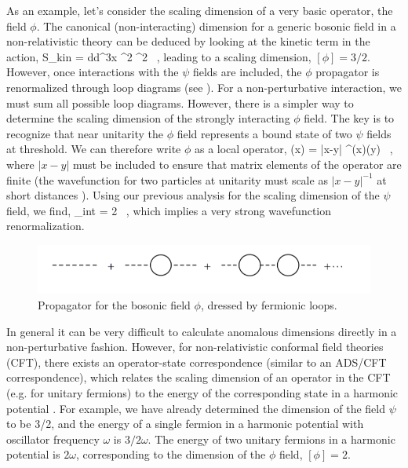 As an example, let's consider the scaling dimension of a very basic operator, the field $\phi$. The canonical (non-interacting) dimension for a generic bosonic field in a non-relativistic theory can be deduced by looking at the kinetic term in the action,
\beq
S_{\mbox{\tiny kin}} = \int d\tau d^3x \nabla^2 \phi^2 \ ,
\eeq
leading to a scaling dimension, $[\phi] = 3/2$. However, once interactions with the $\psi$ fields are included, the $\phi$ propagator is renormalized through loop diagrams (see ). For a non-perturbative interaction, we must sum all possible loop diagrams. However, there is a simpler way to determine the scaling dimension of the strongly interacting $\phi$ field. The key is to recognize that near unitarity the $\phi$ field represents a bound state of two $\psi$ fields at threshold. We can therefore write $\phi$ as a local operator,
\beq
\phi(x) =  |x-y| \psi^{\dagger}(x)\psi(y) \ ,
\eeq
where $|x-y|$ must be included to ensure that matrix elements of the operator are finite (the wavefunction for two particles at unitarity must scale as $|x-y|^{-1}$ at short distances \cite{NishidaSonConformal}). Using our previous analysis for the scaling dimension of the $\psi$ field, we find,
\beq
[\phi]_{\mbox{\tiny int}} = 2 \ ,
\eeq
which implies a very strong wavefunction renormalization.

\begin{figure}
\begin{center}
\includegraphics[width=\linewidth]{Chapter5-figures/dimer2}
\end{center}
\caption{\label{fig:phiprop}Propagator for the bosonic field $\phi$, dressed by fermionic loops.}
\end{figure}

In general it can be very difficult to calculate anomalous dimensions directly in a non-perturbative fashion. However, for non-relativistic conformal field theories (CFT), there exists an operator-state correspondence (similar to an ADS/CFT correspondence), which relates the scaling dimension of an operator in the CFT (e.g. for unitary fermions) to the energy of the corresponding state in a harmonic potential \cite{NishidaSonConformal}. For example, we have already determined the dimension of the field $\psi$ to be 3/2, and the energy of a single fermion in a harmonic potential with oscillator frequency $\omega$ is $3/2 \omega$. The energy of two unitary fermions in a harmonic potential is $2\omega$, corresponding to the dimension of the $\phi$ field, $[\phi]=2$. 

